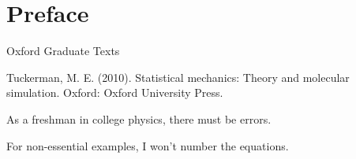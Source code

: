 
\chapter*{Preface}

Oxford Graduate Texts

Tuckerman, M. E. (2010). Statistical mechanics: Theory and molecular simulation. Oxford: Oxford University Press.

As a freshman in college physics, there must be errors.

For non-essential examples, I won't number the equations.